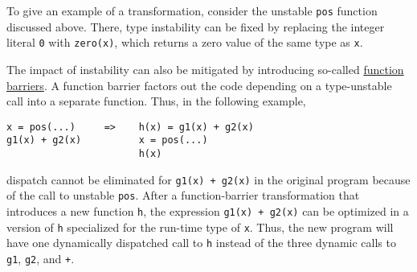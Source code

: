 \documentclass[twocolumn]{article}
\begin{document}
To give an example of a transformation, consider the unstable
\texttt{pos} function discussed above. There, type instability can be
fixed by replacing the integer literal \texttt{0} with \texttt{zero(x)},
which returns a zero value of the same type as \texttt{x}.

The impact of instability can also be mitigated by introducing so-called
\href{https://docs.julialang.org/en/v1/manual/performance-tips/#kernel-functions}{function barriers}.
A function barrier factors out the code
depending on a type-unstable call into a separate function. Thus, in the
following example,
\begin{verbatim}
x = pos(...)     =>    h(x) = g1(x) + g2(x)
g1(x) + g2(x)          x = pos(...)
                       h(x)
\end{verbatim}
dispatch cannot be eliminated for \texttt{g1(x)\ +\ g2(x)} in the
original program because of the call to unstable \texttt{pos}. After a
function-barrier transformation that introduces a new function
\texttt{h}, the expression \texttt{g1(x)\ +\ g2(x)} can be optimized in
a version of \texttt{h} specialized for the run-time type of \texttt{x}.
Thus, the new program will have one dynamically dispatched call to
\texttt{h} instead of the three dynamic calls to \texttt{g1},
\texttt{g2}, and \texttt{+}.


\vspace*{-2em}


\end{document}
